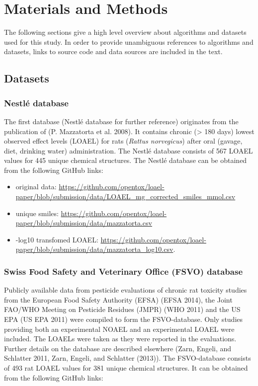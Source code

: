 \documentclass[]{achemso}
\providecommand{\tightlist}{%
  \setlength{\itemsep}{0pt}\setlength{\parskip}{0pt}}
\begin{document}
\section{Materials and Methods}\label{materials-and-methods}

The following sections give a high level overview about algorithms and
datasets used for this study. In order to provide unambiguous references
to algorithms and datasets, links to source code and data sources are
included in the text.

\subsection{Datasets}\label{datasets}

\subsubsection{Nestlé database}\label{nestluxe9-database}

The first database (Nestlé database for further reference) originates
from the publication of (P. Mazzatorta et al. 2008). It contains chronic
(\textgreater{} 180 days) lowest observed effect levels (LOAEL) for rats
(\emph{Rattus norvegicus}) after oral (gavage, diet, drinking water)
administration. The Nestlé database consists of 567 LOAEL values for 445
unique chemical structures. The Nestlé database can be obtained from the
following GitHub links:

\begin{itemize}
\tightlist
\item
  original data:
  \url{https://github.com/opentox/loael-paper/blob/submission/data/LOAEL_mg_corrected_smiles_mmol.csv}
\item
  unique smiles:
  \url{https://github.com/opentox/loael-paper/blob/submission/data/mazzatorta.csv}
\item
  -log10 transfomed LOAEL:
  \url{https://github.com/opentox/loael-paper/blob/submission/data/mazzatorta_log10.csv}.
\end{itemize}

\subsubsection{Swiss Food Safety and Veterinary Office (FSVO)
database}\label{swiss-food-safety-and-veterinary-office-fsvo-database}

Publicly available data from pesticide evaluations of chronic rat
toxicity studies from the European Food Safety Authority (EFSA) (EFSA
2014), the Joint FAO/WHO Meeting on Pesticide Residues (JMPR) (WHO 2011)
and the US EPA (US EPA 2011) were compiled to form the FSVO-database.
Only studies providing both an experimental NOAEL and an experimental
LOAEL were included. The LOAELs were taken as they were reported in the
evaluations. Further details on the database are described elsewhere
(Zarn, Engeli, and Schlatter 2011, Zarn, Engeli, and Schlatter (2013)).
The FSVO-database consists of 493 rat LOAEL values for 381 unique
chemical structures. It can be obtained from the following GitHub links:
\end{document}
